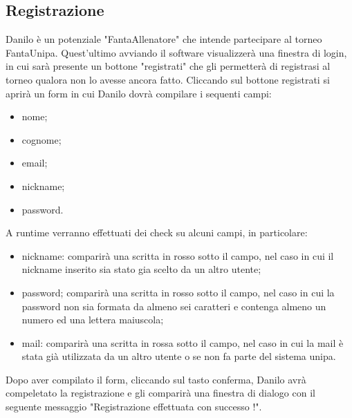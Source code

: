 \documentclass[12pt,a4paper]{article}
\begin{document}
\subsection{Registrazione}
Danilo è un potenziale "FantaAllenatore" che intende partecipare al torneo FantaUnipa. Quest'ultimo avviando il software visualizzerà una finestra di login, in cui sarà presente  un bottone "registrati" che gli permetterà di registrasi al torneo qualora non lo avesse ancora fatto. Cliccando sul bottone registrati si aprirà un form in cui Danilo dovrà compilare i sequenti campi:
\begin{itemize}
\item nome;
\item cognome;
\item email;
\item nickname;
\item password.
\end{itemize}
A runtime verranno effettuati dei check su alcuni campi, in particolare:
\begin{itemize}
\item nickname: comparirà una scritta in rosso sotto il campo, nel caso in cui il nickname inserito sia stato gia scelto da un altro utente;
\item password; comparirà una scritta in rosso sotto il campo, nel caso in cui la password non sia formata da almeno sei caratteri e contenga almeno un numero ed una lettera maiuscola;
\item mail: comparirà una scritta in rossa sotto il campo, nel caso in cui la mail è stata già utilizzata da un altro utente o se non fa parte del sistema unipa.
\end{itemize}
Dopo aver compilato il form, cliccando sul tasto conferma, Danilo avrà compeletato la registrazione e gli comparirà una finestra di dialogo con il seguente messaggio "Registrazione effettuata con successo !".
\end{document}
